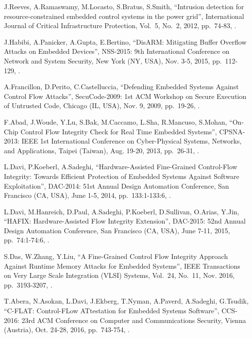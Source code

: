 \begin{thebibliography}{99}
J.Reeves, A.Ramaswamy, M.Locasto, S.Bratus, S.Smith,
``Intrusion detection for resource-constrained embedded control systems in the power grid'',
International Journal of Critical Infrastructure Protection,
Vol.\ 5, No.\ 2, 2012,
pp.\ 74-83,
.

J.Habibi, A.Panicker, A.Gupta, E.Bertino,
``DisARM: Mitigating Buffer Overflow Attacks on Embedded Devices'',
NSS-2015: 9th International Conference on Network and System Security,
New York (NY, USA), Nov. 3-5, 2015,
pp.\ 112-129,
.

A.Francillon, D.Perito, C.Castelluccia,
``Defending Embedded Systems Against Control Flow Attacks'',
SecuCode-2009: 1st ACM Workshop on Secure Execution of Untrusted Code,
Chicago (IL, USA), Nov. 9, 2009,
pp.\ 19-26,
.

F.Abad, J.Woude, Y.Lu, S.Bak, M.Caccamo, L.Sha, R.Mancuso, S.Mohan,
``On-Chip Control Flow Integrity Check for Real Time Embedded Systems'',
CPSNA-2013: IEEE 1st International Conference on Cyber-Physical Systems, Networks, and Applications,
Taipei (Taiwan), Aug. 19-20, 2013,
pp.\ 26-31,
.

L.Davi, P.Koeberl, A.Sadeghi,
``Hardware-Assisted Fine-Grained Control-Flow Integrity: Towards Efficient Protection of Embedded Systems Against Software Exploitation'',
DAC-2014: 51st Annual Design Automation Conference,
San Francisco (CA, USA), June 1-5, 2014,
pp.\ 133:1-133:6,
.

L.Davi, M.Hanreich, D.Paul, A.Sadeghi, P.Koeberl, D.Sullivan, O.Arias, Y.Jin,
``HAFIX: Hardware-Assisted Flow Integrity Extension'',
DAC-2015: 52nd Annual Design Automation Conference,
San Francisco (CA, USA), June 7-11, 2015,
pp.\ 74:1-74:6,
.

S.Das, W.Zhang, Y.Liu,
``A Fine-Grained Control Flow Integrity Approach Against Runtime Memory Attacks for Embedded Systems'',
IEEE Transactions on Very Large Scale Integration (VLSI) Systems,
Vol.\ 24, No.\ 11,
Nov. 2016,
pp.\ 3193-3207,
.

T.Abera, N.Asokan, L.Davi, J.Ekberg, T.Nyman, A.Paverd, A.Sadeghi, G.Tsudik,
``C-FLAT: Control-FLow ATtestation for Embedded Systems Software'',
CCS-2016: 23rd ACM Conference on Computer and Communications Security,
Vienna (Austria), Oct. 24-28, 2016,
pp.\ 743-754,
.


\end{thebibliography}
